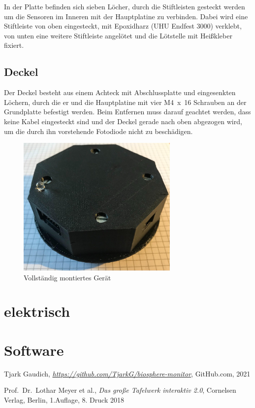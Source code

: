 \documentclass[12pt, a4paper, oneside]{report}
\begin{document}
In der Platte befinden sich sieben Löcher, durch die Stiftleisten gesteckt werden um die Sensoren im Inneren mit der Hauptplatine zu verbinden. Dabei wird eine Stiftleiste von oben eingesteckt, mit Epoxidharz (UHU Endfest 3000) verklebt, von unten eine weitere Stiftleiste angelötet und die Lötstelle mit Heißkleber fixiert.

\section{Deckel}
Der Deckel besteht aus einem Achteck mit Abschlussplatte und eingesenkten Löchern, durch die er und die Hauptplatine mit vier M4~x~16 Schrauben an der Grundplatte befestigt werden. Beim Entfernen muss darauf geachtet werden, dass keine Kabel eingesteckt sind und der Deckel gerade nach oben abgezogen wird, um die durch ihn vorstehende Fotodiode nicht zu beschädigen.
\\
\begin{figure}[h]
	\centering
	\includegraphics[width=0.7\textwidth]{Komplett}
	\caption{Vollständig montiertes Gerät}
	\label{fig:Komplett}
\end{figure}

\chapter{elektrisch}
\label{ch:elektrisch}
\chapter{Software}

\begin{thebibliography}{9}

  Tjark Gaudich,
  \textit{\url{https://github.com/TjarkG/biosphere-monitor}},
  GitHub.com,
  2021
  
  Prof.~Dr.~Lothar Meyer et al.,
  \textit{Das große Tafelwerk interaktiv 2.0},
  Cornelsen Verlag, Berlin,
  1.Auflage, 8. Druck 2018

\end{thebibliography}
\end{document}
